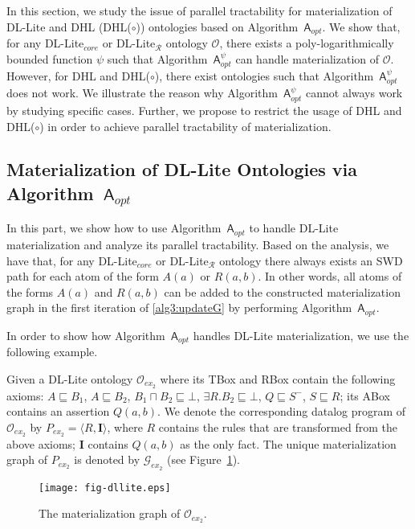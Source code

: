 \documentclass[final,1p,times]{elsarticle}
\begin{document}
In this section, we study the issue of parallel tractability
for materialization of DL-Lite and DHL (DHL($\circ$)) ontologies
based on Algorithm~$\mathsf{A}_{opt}$.
We show that, for any DL-Lite$_{core}$ or DL-Lite$_\mathcal{R}$ ontology $\mathcal{O}$,
there exists a poly-logarithmically bounded function $\psi$
such that Algorithm~$\mathsf{A}_{opt}^{\psi}$ can handle materialization of $\mathcal{O}$.
However, for DHL and DHL($\circ$), there exist ontologies such that Algorithm~$\mathsf{A}_{opt}^\psi$
does not work. We illustrate the reason why Algorithm~$\mathsf{A}_{opt}^\psi$ cannot always
work by studying specific cases.
Further, we propose to restrict the usage of DHL and DHL($\circ$) in order to achieve parallel tractability
of materialization.

\subsection{Materialization of DL-Lite Ontologies via Algorithm~$\mathsf{A}_{opt}$}

In this part, we show how to use Algorithm~$\mathsf{A}_{opt}$ to handle
DL-Lite materialization and analyze its parallel tractability.
Based on the analysis, we have that, for any DL-Lite$_{core}$ or DL-Lite$_\mathcal{R}$ ontology
there always exists an SWD path for each atom of the form $A(a)$ or $R(a,b)$.
In other words, all atoms of the forms $A(a)$ and $R(a,b)$ can be added to
the constructed materialization graph in the first iteration of \ref{alg3:updateG}
by performing Algorithm~$\mathsf{A}_{opt}$.

In order to show how Algorithm~$\mathsf{A}_{opt}$ handles DL-Lite materialization,
we use the following example.

\begin{example}\label{exp:dllite}
Given a DL-Lite ontology $\mathcal{O}_{ex_2}$
where its TBox and RBox contain the following axioms:
$A\sqsubseteq B_1$, $A\sqsubseteq B_2$, $B_1\sqcap B_2\sqsubseteq\bot$,
$\exists R.B_2\sqsubseteq\bot$, $Q\sqsubseteq S^-$, $S\sqsubseteq R$;
its ABox contains an assertion $Q(a,b)$.
We denote the corresponding datalog program of $\mathcal{O}_{ex_2}$ by $P_{ex_2}=\langle R, \textbf{I}\rangle$,
where $R$ contains the rules that are transformed from the above axioms; $\textbf{I}$ contains $Q(a,b)$
as the only fact.
The unique materialization graph of $P_{ex_2}$ is denoted by $\mathcal{G}_{ex_2}$ (see Figure~\ref{fig:ex2}).
\end{example}

\begin{figure}[htbp]
\begin{center}
\texttt{[image: fig-dllite.eps]}
\caption{The materialization graph of $\mathcal{O}_{ex_2}$.}
\label{fig:ex2}
\end{center}
\end{figure}
\end{document}
